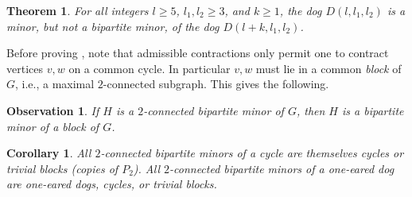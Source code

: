 \documentclass[a4paper,preprint,12pt]{elsarticle}
\newtheorem{theorem}{Theorem}
\newtheorem{corollary}{Corollary}
\newtheorem{observation}{Observation}
\begin{document}
\begin{theorem}
    \label{thm: minor but not bip minor}
    For all integers $l\geq 5$, $l_1,l_2\geq 3$, and $k\geq 1$, the dog $D(l,l_1,l_2)$ is a minor, but not a bipartite minor, of the dog $D(l+k,l_1,l_2)$.
\end{theorem}

Before proving , note that admissible contractions only permit one to contract vertices $v,w$ on a common cycle.
In particular $v,w$ must lie in a common \emph{block} of $G$, i.e., a maximal $2$-connected subgraph.
This gives the following.
\begin{observation}
    \label{obs: 2-conn bip minor implies bip minor of block}
    If $H$ is a $2$-connected bipartite minor of $G$, then $H$ is a bipartite minor of a block of $G$.
\end{observation}

\begin{corollary} 
    \label{cor: 2-conn bip minor implies bip minor of block}
    All $2$-connected bipartite minors of a cycle are themselves cycles or 
    \emph{trivial blocks} (copies of $P_2$).
    All $2$-connected bipartite minors of a one-eared dog are one-eared dogs, cycles, 
    or trivial blocks.
\end{corollary}
\end{document}
